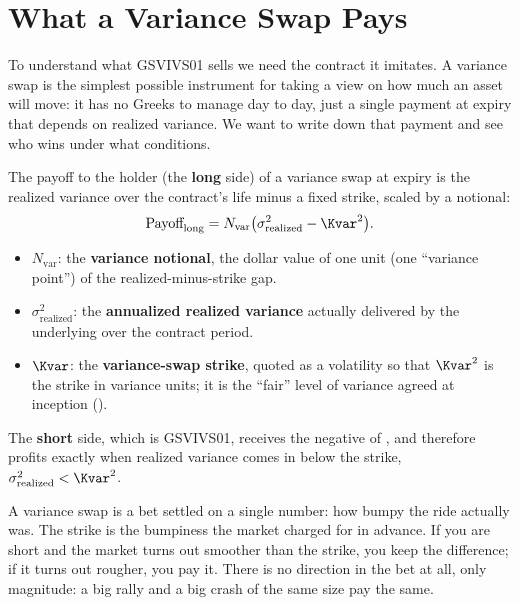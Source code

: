 \section{What a Variance Swap Pays}
\label{sec:gsvivs:varswap-payoff}

To understand what GSVIVS01 sells we need the contract it imitates. A variance swap is the simplest possible instrument for taking a view on how much an asset will move: it has no Greeks to manage day to day, just a single payment at expiry that depends on realized variance. We want to write down that payment and see who wins under what conditions.

The payoff to the holder (the \textbf{long} side) of a variance swap at expiry is the realized variance over the contract's life minus a fixed strike, scaled by a notional:
\begin{equation}
\label{eq:gsvivs:varswap-payoff}
\text{Payoff}_{\text{long}} = N_{\text{var}}\big(\sigma^2_{\text{realized}} - \Kvar^2\big).
\end{equation}
\begin{itemize}
  \item $N_{\text{var}}$: the \textbf{variance notional}, the dollar value of one unit (one ``variance point'') of the realized-minus-strike gap.
  \item $\sigma^2_{\text{realized}}$: the \textbf{annualized realized variance} actually delivered by the underlying over the contract period.
  \item $\Kvar$: the \textbf{variance-swap strike}, quoted as a volatility so that $\Kvar^2$ is the strike in variance units; it is the ``fair'' level of variance agreed at inception ().
\end{itemize}
The \textbf{short} side, which is GSVIVS01, receives the negative of , and therefore profits exactly when realized variance comes in below the strike, $\sigma^2_{\text{realized}} < \Kvar^2$.

\begin{intuition}
A variance swap is a bet settled on a single number: how bumpy the ride actually was. The strike is the bumpiness the market charged for in advance. If you are short and the market turns out smoother than the strike, you keep the difference; if it turns out rougher, you pay it. There is no direction in the bet at all, only magnitude: a big rally and a big crash of the same size pay the same.
\end{intuition}

